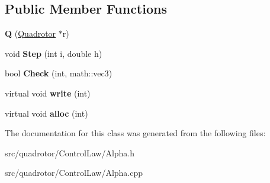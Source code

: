 \subsection*{\-Public \-Member \-Functions}
\begin{DoxyCompactItemize}
\item 
\hypertarget{classAlpha1_1_1Q_a5c0a4a0d93f91068ba3157fd23b5e9ee}{{\bfseries \-Q} (\hyperlink{classQuadrotor}{\-Quadrotor} $\ast$r)}\label{classAlpha1_1_1Q_a5c0a4a0d93f91068ba3157fd23b5e9ee}

\item 
\hypertarget{classAlpha1_1_1Q_ac3f815ffaeb081809f36870cc27c39c1}{void {\bfseries \-Step} (int i, double h)}\label{classAlpha1_1_1Q_ac3f815ffaeb081809f36870cc27c39c1}

\item 
\hypertarget{classAlpha1_1_1Q_a5aeb733bd457272c4aadcb954461b071}{bool {\bfseries \-Check} (int, math\-::vec3)}\label{classAlpha1_1_1Q_a5aeb733bd457272c4aadcb954461b071}

\item 
\hypertarget{classAlpha1_1_1Q_a2d5895d825723a46858f38bbfb3fa1a0}{virtual void {\bfseries write} (int)}\label{classAlpha1_1_1Q_a2d5895d825723a46858f38bbfb3fa1a0}

\item 
\hypertarget{classAlpha1_1_1Q_a41dfc4912bed18a371c98b3046441e59}{virtual void {\bfseries alloc} (int)}\label{classAlpha1_1_1Q_a41dfc4912bed18a371c98b3046441e59}

\end{DoxyCompactItemize}


\-The documentation for this class was generated from the following files\-:\begin{DoxyCompactItemize}
\item 
src/quadrotor/\-Control\-Law/\-Alpha.\-h\item 
src/quadrotor/\-Control\-Law/\-Alpha.\-cpp\end{DoxyCompactItemize}
